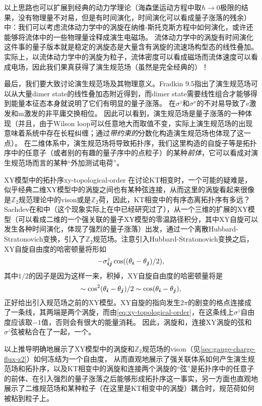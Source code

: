 以上思路也可以扩展到经典的动力学理论（海森堡运动方程中取$\hbar \to 0$极限的结果，没有物理量不对易，但是有时间演化，时间演化可以看成量子涨落的残余）中：我们可以考虑流体动力学中的涡旋在纳维-斯托克斯方程中如何演化，或许还能够将流体中的一些物理量诠释成演生电磁场。
流体动力学中的涡旋有时间演化这件事的量子版本就是稳定的涡旋态是大量含有涡旋的流速场构型态的线性叠加。实际上，以流体动力学中的涡旋为粒子，流体密度可以看成磁场而流体速度可以看成电场，因此我们果真获得了演生规范场（虽然是完全经典的）！

最后，我们要大致讨论演生规范场及其物理意义。Fradkin 9.5指出了演生规范场可以从大量dimer state的线性叠加态附近得到，而dimer state需要线性组合才能够得到能量本征态本身就说明了它们有明显的量子涨落。
在$\sigma^z$和$\sigma^x$的不对易导致了e激发和m激发的非平庸交换相位。
因此可以看到，演生规范场是量子涨落的一种体现（并且，由于Wilson loop可以任意地大而取值不变，实际上演生规范场的出现意味着系统中存在长程纠缠；通过\emph{带约束的}分数化构造演生规范场也体现了这一点）。
在二维体系中，演生规范场将导致拓扑序，我们这里构造的自旋子等是拓扑序中的任意子（或者别的有趣的量子序中的点粒子）的某种\emph{前体}，它可以看成对演生规范场而言的某种“外加测试电荷”。

\begin{info}{XY模型中的拓扑序}{xy-topological-order}
    在讨论KT相变时，一个可能的疑难是，似乎经典二维XY模型中的涡旋之间也有某种弦连接，从而这里的涡旋看起来很像是$\mathbb{Z}_2$规范理论中的vison或是$\mathbb{Z}_2$荷，因此，KT相变中的有序态离拓扑序有多远？
    Sachdev在\cite{sachdev_xy}和\cite{Sachdev_2018_full}中（这个现象实际上在\cite{sedgewick2002}中已经研究过了），从一个三维的扩展的XY模型（可以看成二维的一个强关联的量子XY模型的零温路径积分，其中XY自旋可以发生各种时间演化，体现了强烈的量子涨落）出发，通过一个离散Hubbard-Stratonovich变换，引入了$\mathbb{Z}_2$规范场。注意引入Hubbard-Stratonovich变换之后，XY自旋自由度的哈密顿量将形如
    \begin{equation}
        - \sigma^z_{\vb*{i} \vb*{j}} \cos((\theta_{\vb*{i}} - \theta_{\vb*{j}}) / 2),
        \label{eq:xy-topological-order}
    \end{equation}
    其中$1/2$的因子是因为这样一来，积掉，XY自旋自由度的哈密顿量将是
    \[
        \sim \cos^2(\theta_{\vb*{i}} - \theta_{\vb*{j}}) / 2 \sim \cos (\theta_{\vb*{i}} - \theta_{\vb*{j}}),
    \]
    正好给出引入规范场之前的XY模型。XY自旋的指向发生$2\pi$的剧变的格点连接成了一条线，其两端是两个涡旋，而由\eqref{eq:xy-topological-order}，在这条线上$\sigma^z$自由度应该取$-1$值，否则会有很大的能量消耗。
    因此，涡旋和，连接XY涡旋的弦和$\sigma^z$弦被粘合在了一起，一个。

    以上推导明确地展示了XY模型中的涡旋和$\mathbb{Z}_2$规范场的vison（见\autoref{sec:gauge-charge-flux-z2}）如何冻结为一个自由度，
    从而直观地展示了强关联体系如何产生演生规范场和拓扑序，以及KT相变中的涡旋和连接两个涡旋的“弦”是拓扑序中的任意子的前体、在引入强烈的量子涨落之后能够形成拓扑序这一事实，另一方面也直观地展示了二维规范场和某种粒子（在这里是KT相变中的涡旋）耦合时，规范荷如何被粘到粒子上。
\end{info}


